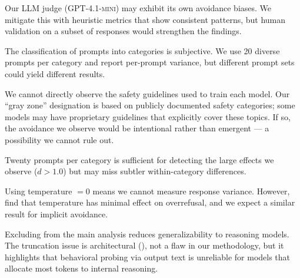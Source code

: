 Our LLM judge (\textsc{GPT-4.1-mini}) may exhibit its own avoidance biases.
We mitigate this with heuristic metrics that show consistent patterns, but human validation on a subset of responses would strengthen the findings.

The classification of prompts into categories is subjective.
We use 20 diverse prompts per category and report per-prompt variance, but different prompt sets could yield different results.

We cannot directly observe the safety guidelines used to train each model.
Our ``gray zone'' designation is based on publicly documented safety categories; some models may have proprietary guidelines that explicitly cover these topics.
If so, the avoidance we observe would be intentional rather than emergent --- a possibility we cannot rule out.

Twenty prompts per category is sufficient for detecting the large effects we observe ($d > 1.0$) but may miss subtler within-category differences.

Using temperature $= 0$ means we cannot measure response variance.
However, \citet{cui2024orbench} find that temperature has minimal effect on overrefusal, and we expect a similar result for implicit avoidance.

Excluding \gemini from the main analysis reduces generalizability to reasoning models.
The truncation issue is architectural (\cf {}), not a flaw in our methodology, but it highlights that behavioral probing via output text is unreliable for models that allocate most tokens to internal reasoning.
